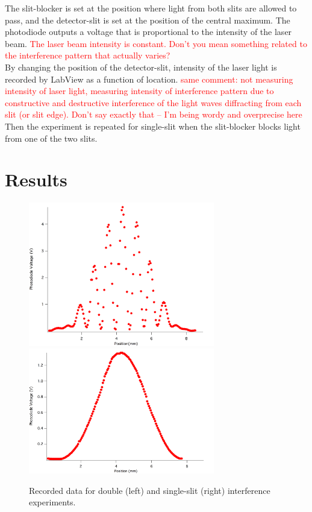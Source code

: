 \documentclass[prb,preprint]{revtex4-1}
\begin{document}
The slit-blocker is set at the position where light from both slits are allowed to pass, and the detector-slit is set at the position of the central maximum. The photodiode outputs a voltage that is proportional to the intensity of the laser beam. \textcolor{red}{The laser beam intensity is constant. Don't you mean something related to the interference pattern that actually varies?}\\ 

By changing the position of the detector-slit, intensity of the laser light is recorded by LabView as a function of location. \textcolor{red}{same comment: not measuring intensity of laser light, measuring intensity of interference pattern due to constructive and destructive interference of the light waves diffracting from each slit (or slit edge). Don't say exactly that -- I'm being wordy and overprecise here}  Then the experiment is repeated for single-slit when the slit-blocker blocks light from one of the two slits. \\
\section{Results}

\begin{figure}[h]
\centering
\includegraphics[width=3.2in]{doubleres.png}
\includegraphics[width=3.2in]{singleres.png}
\caption{Recorded data for double (left) and single-slit (right) interference experiments.}
\label{ds}
\end{figure}
\end{document}
